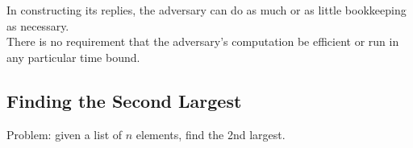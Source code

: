 \documentclass[12pt]{article}
\theoremstyle{plain}
\theoremstyle{definition}
\begin{document}
In constructing its replies, the adversary can do as much or as little bookkeeping as necessary. \\
There is no requirement that the adversary's computation be efficient or run in any particular time bound.

\subsection{Finding the Second Largest}
Problem: given a list of $n$ elements, find the 2nd largest. \\

\clearpage
\printindex
\end{document}
